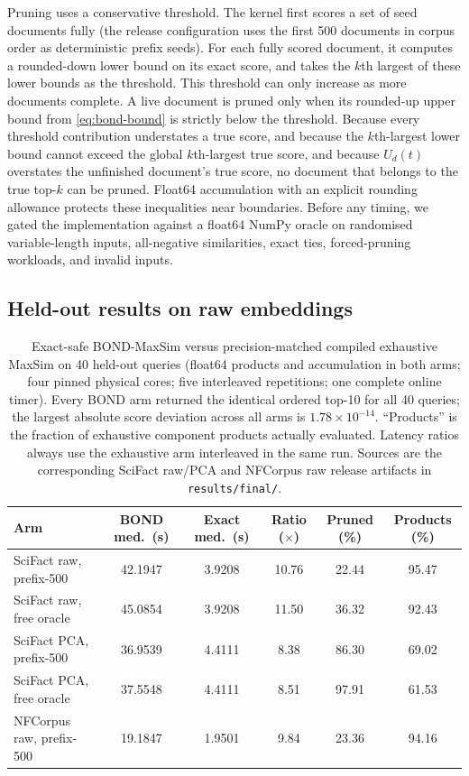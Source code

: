 Pruning uses a conservative threshold. The kernel first scores a set of 
seed documents fully (the release configuration uses the first 500 documents 
in corpus order as deterministic prefix seeds). For each fully scored document, 
it computes a rounded-down lower bound on its exact score, and takes the $k$th 
largest of these lower bounds as the threshold. This threshold can only increase 
as more documents complete. A live document is pruned only when its rounded-up 
upper bound from \cref{eq:bond-bound} is strictly below the threshold. Because 
every threshold contribution understates a true score, and because the $k$th-largest 
lower bound cannot exceed the global $k$th-largest true score, and because $U_d(t)$ 
overstates the unfinished document's true score, no document that belongs to the 
true top-$k$ can be pruned. Float64 accumulation with an explicit rounding allowance 
protects these inequalities near boundaries. Before any timing, we gated the 
implementation against a float64 NumPy oracle on randomised variable-length inputs, 
all-negative similarities, exact ties, forced-pruning workloads, and invalid inputs.

\subsection{Held-out results on raw embeddings}
\label{sec:bond-raw}

\begin{table}[tb]
  \centering
  \caption{Exact-safe BOND-MaxSim versus precision-matched compiled exhaustive
    MaxSim on 40 held-out queries (float64 products and accumulation in both
    arms; four pinned physical cores; five interleaved repetitions; one
    complete online timer). Every BOND arm returned the identical ordered
    top-10 for all 40 queries; the largest absolute score deviation across all
    arms is $1.78 \times 10^{-14}$. ``Products'' is the fraction of exhaustive
    component products actually evaluated. Latency ratios always use the
    exhaustive arm interleaved in the same run. Sources are the corresponding
    SciFact raw/PCA and NFCorpus raw release artifacts in
    \texttt{results/final/}.}
  \label{tab:bond}
  \small
  \setlength{\tabcolsep}{4.5pt}
  \begin{tabular}{@{}l S[table-format=2.4] S[table-format=1.4] S[table-format=2.2] S[table-format=2.2] S[table-format=2.2]@{}}
    \toprule
    Arm & {BOND med.\ (\si{\second})} & {Exact med.\ (\si{\second})} & {Ratio ($\times$)} & {Pruned (\%)} & {Products (\%)} \\
    \midrule
    SciFact raw, prefix-500     & 42.1947 & 3.9208 & 10.76 & 22.44 & 95.47 \\
    SciFact raw, free oracle    & 45.0854 & 3.9208 & 11.50 & 36.32 & 92.43 \\
    SciFact PCA, prefix-500     & 36.9539 & 4.4111 &  8.38 & 86.30 & 69.02 \\
    SciFact PCA, free oracle    & 37.5548 & 4.4111 &  8.51 & 97.91 & 61.53 \\
    NFCorpus raw, prefix-500    & 19.1847 & 1.9501 &  9.84 & 23.36 & 94.16 \\
    \bottomrule
  \end{tabular}
\end{table}

